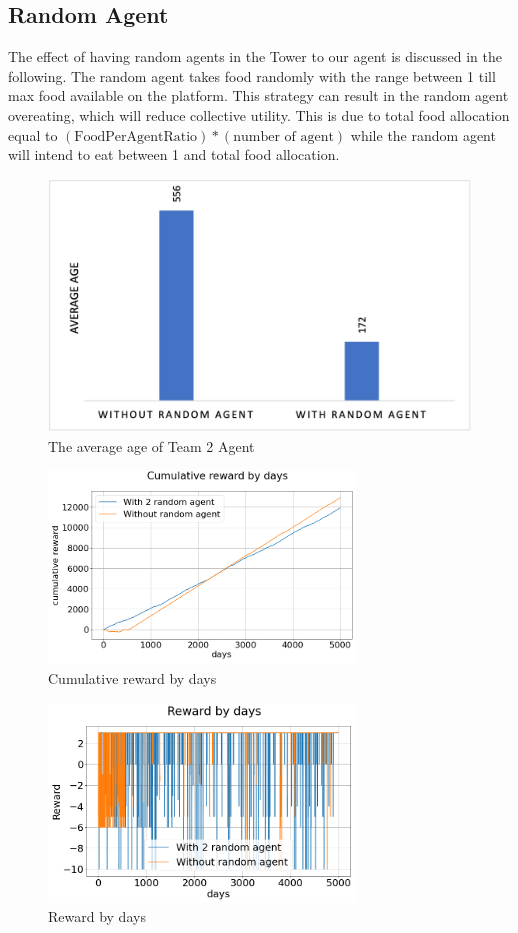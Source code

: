 \subsection{Random Agent}
The effect of having random agents in the Tower to our agent is discussed in the following. The random agent takes food randomly with the range between 1 till max food available on the platform. This strategy can result in the random agent overeating, which will reduce collective utility. This is due to total food allocation equal to $(\textrm{FoodPerAgentRatio}) * (\textrm{number of agent})$ while the random agent will intend to eat between 1 and total food allocation.
\begin{figure}
\centering
\includegraphics{004_team_2_agent_design/team2avage}
\caption{The average age of Team 2 Agent}
\label{team2av}
\end{figure}
\begin{figure}
\centering
\includegraphics{004_team_2_agent_design/cumrewardbydays}
\caption{Cumulative reward by days}
\label{cumreward-team2}
\end{figure}
\begin{figure}
\centering
\includegraphics{004_team_2_agent_design/rewardbydays}
\caption{Reward by days}
\label{dayreward-team2}
\end{figure}

